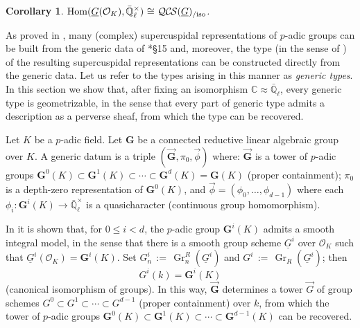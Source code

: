 \documentclass[10pt]{amsart}
\theoremstyle{plain}
\newtheorem{corollary}[theorem]{Corollary}
\theoremstyle{definition}
\newcommand{\CC}{{\mathbb{C}}}
\newcommand{\EE}{\mathbb{\bar Q}_\ell}
\newcommand{\OK}{\mathcal{O}_K}
\newcommand{\Fq}{k}
\newcommand{\EEx}{\EE^\times}
\newcommand{\G}{\textbf{G}}
\DeclareMathOperator{\Hom}{Hom}
\DeclareMathOperator{\Gr}{Gr}
\newcommand{\ceq}{{\, :=\, }}
\newcommand{\iso}{{\ \cong\ }}
\newcommand{\QCS}{{\mathcal{QC\hskip-0.8pt S}}}
\newcommand{\QCSiso}[1]{\QCS(#1)_{/\text{iso}}}
\begin{document}
\begin{corollary}\label{cor:QCS}
$\Hom(\underline{G}(\OK),\EEx) \iso \QCSiso{\underline{G}}$.
\end{corollary}

 


As proved in \cite{kim:07a}, many (complex) supercuspidal representations of $p$-adic groups can be built from the generic data of \cite{yu:01a}*{\S 15} and, moreover, the type (in the sense of \cite{bushnell-kutzko:98a}) of the resulting supercuspidal representations can be constructed directly from the generic data. 
Let us refer to the types arising in this manner as {\it generic types}.
In this section we show that, after fixing an isomorphism $\CC \approx \EE$, every generic type is geometrizable, in the sense that every part of generic type admits a description as a perverse sheaf, from which the type can be recovered.

Let $K$ be a $p$-adic field. Let $\G$ be a connected reductive linear algebraic group over $K$. 
A generic datum is a triple $(\vec{\G}, \pi_0, \vec{\phi})$ where: $\vec{\G}$ is a tower of $p$-adic groups $\G^0(K) \subset \G^1(K) \subset \cdots  \subset \G^d(K) = \G(K)$ (proper containment); $\pi_0$ is a depth-zero representation of $\G^0(K)$, and $\vec{\phi} = (\phi_0, \ldots , \phi_{d-1})$ where each $\phi_i : \G^i(K) \to \EEx$ is a quasicharacter (continuous group homomorphism).  


In \cite{yu:03a} it is shown that, for $0 \leq i < d$, the $p$-adic group $\G^i(K)$ admits a smooth integral model, in the sense that there is a smooth group scheme $\underline{G}^i$ over $\OK$ such that $\underline{G}^i(\OK) = \G^i(K)$.
Set $G^i_n \ceq \Gr^R_n(\underline{G}^i)$ and $G^i \ceq \Gr_R(\underline{G}^i)$; 
then \[G^i(\Fq) = \G^i(K)\] (canonical isomorphism of groups).
In this way, $\vec{\G}$ determines a tower $\vec{G}$ of group schemes $G^0 \subset G^1 \subset \cdots  \subset G^{d-1}$ (proper containment) over $\Fq$, from which the tower of $p$-adic groups
$\G^0(K) \subset \G^1(K) \subset \cdots  \subset \G^{d-1}(K)$ can be recovered.
\end{document}
